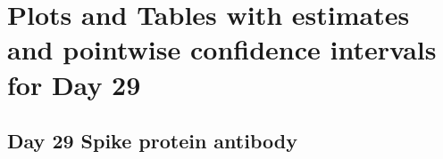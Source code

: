 \documentclass[]{book}
\theoremstyle{definition}
\theoremstyle{definition}
\theoremstyle{definition}
\newcommand{\1}{\mathbbm{1}}
\begin{document}
\newpage

\newpage

\hypertarget{plots-and-tables-with-estimates-and-pointwise-confidence-intervals-for-day-29}{%
\section{Plots and Tables with estimates and pointwise confidence intervals for Day 29}\label{plots-and-tables-with-estimates-and-pointwise-confidence-intervals-for-day-29}}

\newpage

\newpage

\hypertarget{day-29-spike-protein-antibody}{%
\subsection{Day 29 Spike protein antibody}\label{day-29-spike-protein-antibody}}
\end{document}
